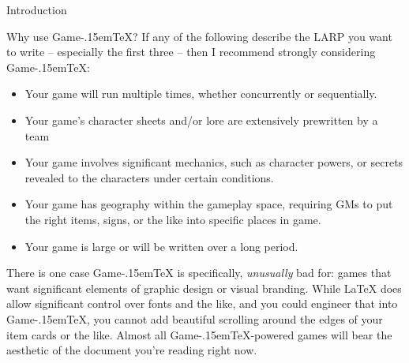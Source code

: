 \documentclass[11pt]{article}
\def\gametex{\mbox{Game\kern-.15em\TeX}}
\begin{document}
\begin{section}{Introduction}
\begin{subsection}{Why use \gametex{}?}
If any of the following describe the LARP you want to write -- especially the first three -- then I recommend strongly considering \gametex{}:
\begin{itemize}
\item Your game will run multiple times, whether concurrently or sequentially.
\item Your game's character sheets and/or lore are extensively prewritten by a team 
\item Your game involves significant mechanics, such as character powers, or secrets revealed to the characters under certain conditions.
\item Your game has geography within the gameplay space, requiring GMs to put the right items, signs, or the like into specific places in game.
\item Your game is large or will be written over a long period.
\end{itemize}

There is one case \gametex{} is specifically, \emph{unusually} bad for: games that want significant elements of graphic design or visual branding.  While \LaTeX{} does allow significant control over fonts and the like,
and you could engineer that into \gametex{}, you cannot add beautiful scrolling around the edges of your item cards or the like.  Almost all \gametex{}-powered games will bear the aesthetic of the document you're reading right now.
\end{subsection}
\end{section}
\end{document}
